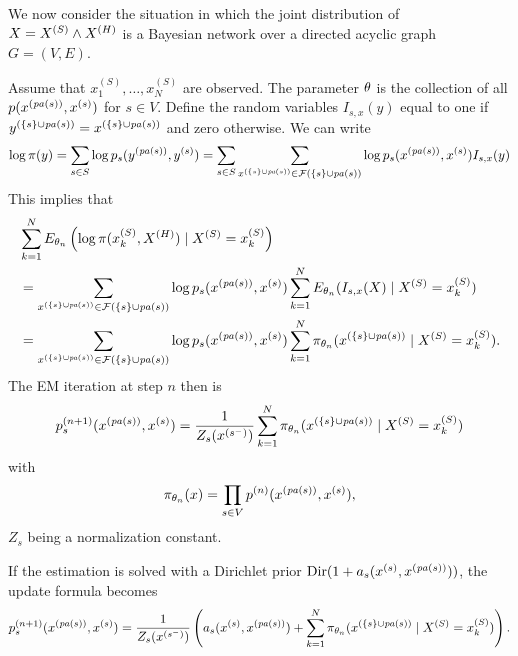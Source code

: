 We now consider the situation in which the joint distribution of
$X = X^{(S)}\wedge X^{(H)}$ is a Bayesian network over a directed acyclic graph
$G=(V,E)$.  

Assume that $x_1^{(S)}, \ldots, x^{(S)}_N$ are observed. The
parameter $\theta$ is the collection of all $p(x^{({\mathit{pa}(s)})}, x^{(s)})$ for $s\in
V$. Define the random variables $I_{s, x}(y)$ equal to one if
$y^{(\{s\}\cup {\mathit{pa}(s)})} = x^{(\{s\}\cup {\mathit{pa}(s)})}$ and zero otherwise. We can write
\[
\log \pi(y) = \sum_{s\in S} \log p_s(y^{({\mathit{pa}(s)})}, y^{(s)})
= \sum_{s\in S}\sum_{x^{(\{s\}\cup {\mathit{pa}(s)})}\in {\mathcal F}(\{s\}\cup {\mathit{pa}(s)})} \log
p_s(x^{({\mathit{pa}(s)})}, x^{(s)}) I_{s,x}(y)
\]
This implies that 
\begin{align*}
& \sum_{k=1}^N E_{\theta_n}\left(\log\pi(x_k^{(S)},
X^{(H)})\mid  X^{(S)} = x_k^{(S)}\right)  \\
&= \sum_{x^{(\{s\}\cup {\mathit{pa}(s)})}\in {\mathcal F}(\{s\}\cup {\mathit{pa}(s)})} \log
p_s(x^{({\mathit{pa}(s)})}, x^{(s)})  \sum_{k=1}^N E_{\theta_n}(I_{s,x}(X)\mid  X^{(S)} = x_k^{(S)})
\\
&= \sum_{x^{(\{s\}\cup {\mathit{pa}(s)})}\in {\mathcal F}(\{s\}\cup {\mathit{pa}(s)})} \log
p_s(x^{({\mathit{pa}(s)})}, x^{(s)})  \sum_{k=1}^N \pi_{\theta_n}(x^{(\{s\}\cup {\mathit{pa}(s)})}\mid  X^{(S)} = x_k^{(S)}).
\end{align*}
The EM iteration at step $n$ then is
$$
p^{(n+1)}_s(x^{({\mathit{pa}(s)})}, x^{(s)}) = \frac{1}{Z_s(x^{(s^{-})})} \sum_{k=1}^N
\pi_{\theta_n}(x^{(\{s\}\cup {\mathit{pa}(s)})}\mid  X^{(S)} = x_k^{(S)})
$$
with 
$$
\pi_{\theta_n}(x) = \prod_{s\in V} p^{(n)}(x^{({\mathit{pa}(s)})}, x^{(s)}),
$$
$Z_s$ being a normalization constant.

If the estimation is solved with a Dirichlet prior $\text{Dir}(1+a_s(x^{(s)},
x^{({\mathit{pa}(s)})}))$, the update formula becomes
\begin{equation}
\label{eq:em.tree}
p^{(n+1)}_s(x^{({\mathit{pa}(s)})}, x^{(s)}) =  \frac{1}{Z_s(x^{(s^{-})})} \left(a_s(x^{(s)}, x^{({\mathit{pa}(s)})})
+ \sum_{k=1}^N
\pi_{\theta_n}(x^{(\{s\}\cup {\mathit{pa}(s)})} \mid X^{(S)} = x_k^{(S)})\right).
\end{equation}

